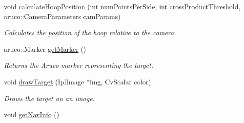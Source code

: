 \begin{DoxyCompactItemize}
void \hyperlink{classTarget_a888695431f7e2c1cfaba678dbd99b6d1}{calculateHoopPosition} (int numPointsPerSide, int crossProductThreshold, aruco::CameraParameters camParams)
\begin{DoxyCompactList}\small\item\em Calculates the position of the hoop relative to the camera. \item\end{DoxyCompactList}\item 
aruco::Marker \hyperlink{classTarget_ac639d54e469f2a463ef6e3c22261b108}{getMarker} ()
\begin{DoxyCompactList}\small\item\em Returns the Aruco marker representing the target. \item\end{DoxyCompactList}\item 
void \hyperlink{classTarget_a81f8b1e169947fd2db3aed6356273ad2}{drawTarget} (IplImage $\ast$img, CvScalar color)
\begin{DoxyCompactList}\small\item\em Draws the target on an image. \item\end{DoxyCompactList}\item 
void \hyperlink{classTarget_a60f06174aec80a151a02ef5c6ef2735d}{getNavInfo} ()
\end{DoxyCompactItemize}
